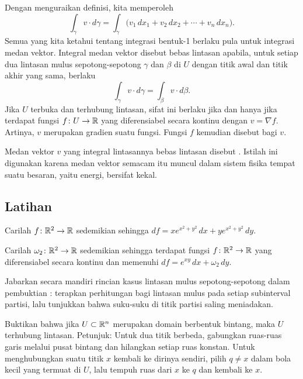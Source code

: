 Dengan menguraikan definisi, kita memperoleh
\begin{equation*}
\int_{\gamma} v \cdot d\gamma
=
\int_{\gamma} \bigl(v_1 \,dx_1 + v_2 \,dx_2 + \cdots + v_n \,dx_n\bigr) .
\end{equation*}
Semua yang kita ketahui tentang integrasi bentuk-1 berlaku pula untuk integrasi
medan vektor. Integral medan vektor disebut bebas lintasan apabila, untuk setiap
dua lintasan mulus sepotong-sepotong $\gamma$ dan $\beta$ di $U$ dengan titik
awal dan titik akhir yang sama, berlaku
\begin{equation*}
\int_\gamma v \cdot d\gamma = \int_\beta v \cdot d\beta .
\end{equation*}
Jika $U$ terbuka dan terhubung lintasan, sifat ini berlaku jika dan hanya jika
terdapat fungsi
$f \colon U\to{\mathbb{R}}$ yang diferensiabel secara kontinu dengan
$v = \nabla f$. Artinya, $v$ merupakan gradien suatu fungsi. Fungsi $f$
kemudian disebut \emph{} bagi $v$.

Medan vektor $v$ yang integral lintasannya bebas lintasan disebut
\emph{}. Istilah ini digunakan karena medan
vektor semacam itu muncul dalam sistem fisika tempat suatu besaran, yaitu
energi, bersifat kekal.

\subsection{Latihan}

\begin{exercise}
Carilah $f \colon {\mathbb{R}}^2 \to {\mathbb{R}}$ sedemikian sehingga $df = xe^{x^2+y^2}\, dx +
ye^{x^2+y^2} \, dy$.
\end{exercise}

\begin{exercise}
Carilah $\omega_2 \colon {\mathbb{R}}^2 \to {\mathbb{R}}$ sedemikian sehingga terdapat fungsi
$f \colon {\mathbb{R}}^2 \to {\mathbb{R}}$ yang diferensiabel secara kontinu dan memenuhi
$df = e^{xy} \,dx + \omega_2 \,dy$.
\end{exercise}

\begin{exercise}
Jabarkan secara mandiri rincian kasus lintasan mulus sepotong-sepotong dalam
pembuktian : terapkan perhitungan bagi lintasan mulus
pada setiap subinterval partisi, lalu tunjukkan bahwa suku-suku di titik partisi
saling meniadakan.
\end{exercise}

\begin{exercise}
Buktikan bahwa jika $U \subset {\mathbb{R}}^n$ merupakan domain berbentuk bintang, maka
$U$ terhubung lintasan. Petunjuk: Untuk dua titik berbeda, gabungkan ruas-ruas
garis melalui pusat bintang dan hilangkan setiap ruas konstan. Untuk
menghubungkan suatu titik $x$ kembali ke dirinya sendiri, pilih $q\neq x$ dalam
bola kecil yang termuat di $U$, lalu tempuh ruas dari $x$ ke $q$ dan kembali ke
$x$.
\end{exercise}

